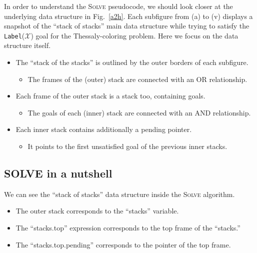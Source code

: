 \documentclass{ws-ijait}
\begin{document}
In order to understand the \textsc{Solve} pseudocode, we
should look closer at the underlying data structure in
Fig.~\ref{a2h}. Each subfigure from (a) to (v) displays a
snapshot of the ``stack of stacks'' main data structure
while trying to satisfy the \texttt{Label}($\mathscr{X}$)
goal for the Thessaly-coloring problem. Here we focus on the
data structure itself.
\begin{itemize}
  \item The ``stack of the stacks'' is outlined by the outer
        borders of each subfigure.
        \begin{itemize}
          \item The frames of the (outer) stack are
                connected with an \textsf{OR} relationship.
        \end{itemize}
  \item Each frame of the outer stack is a stack too,
        containing goals.
        \begin{itemize}
          \item The goals of each (inner) stack are
                connected with an \textsf{AND} relationship.
        \end{itemize}
  \item Each inner stack contains additionally a
        \textsf{pending} pointer.
        \begin{itemize}
          \item It points to the first unsatisfied goal of
                the previous inner stacks.
        \end{itemize}
\end{itemize}

\newcommand{\Solve}{{\normalsize S\footnotesize OLVE}}

\subsection{\Solve{} in a nutshell}

We can see the ``stack of stacks'' data structure inside the
\textsc{Solve} algorithm.
\begin{itemize}
  \item The outer stack corresponds to the ``stacks''
        variable.
  \item The ``stacks.top'' expression corresponds to the top
        frame of the ``stacks.''
  \item The ``stacks.top.pending'' corresponds to the
        pointer of the top frame.
\end{itemize}
\end{document}
